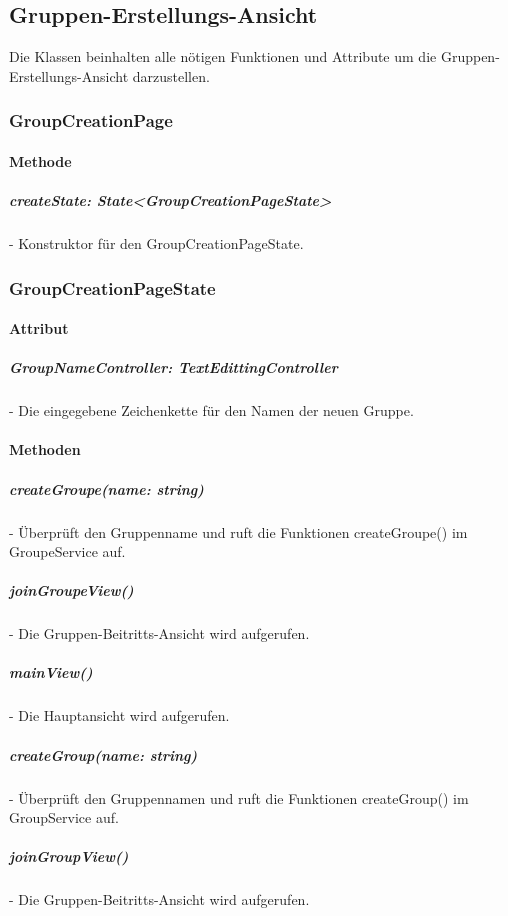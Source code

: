\documentclass[parskip=full]{scrartcl}
\begin{document}
    \newpage

\subsection{Gruppen-Erstellungs-Ansicht}
    Die Klassen beinhalten alle nötigen Funktionen und Attribute um die Gruppen-Erstellungs-Ansicht darzustellen.

    \subsubsection{GroupCreationPage}
        \paragraph*{Methode}
            \subparagraph*{createState: State<GroupCreationPageState>} - Konstruktor für den GroupCreationPageState.
    
    \subsubsection{GroupCreationPageState}
        \paragraph*{Attribut}
            \subparagraph*{GroupNameController: TextEdittingController} - Die eingegebene Zeichenkette für den Namen der neuen Gruppe.

        \paragraph*{Methoden}
            \subparagraph*{createGroupe(name: string)} - Überprüft den Gruppenname und ruft die Funktionen createGroupe() im GroupeService auf.
            \subparagraph*{joinGroupeView()} -  Die Gruppen-Beitritts-Ansicht wird aufgerufen.
            \subparagraph*{mainView()} - Die Hauptansicht wird aufgerufen.


            \subparagraph*{createGroup(name: string)} - Überprüft den Gruppennamen und ruft die Funktionen createGroup() im GroupService auf.
            \subparagraph*{joinGroupView()} -  Die Gruppen-Beitritts-Ansicht wird aufgerufen.
\end{document}
